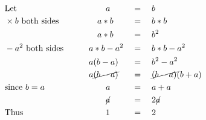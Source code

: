 \begin{alignat*}{3}
&\mathrm{Let}&&\qquad a&&=\quad b\\
&\times b~\mathrm{both~sides}&&\quad a*b&&=\quad b*b\\
&\,&&\quad a*b&&=\quad b^2\\
&-a^2~\mathrm{both~sides}\qquad&& a*b-a^2&&=\quad b*b-a^2\\
&\,&&a(b-a)&&=\quad b^2-a^2\\
&\,&&a\cancel{(b-a)}&&=\quad\cancel{(b-a)}(b+a)\\
&\mathrm{since}~b=a&&\qquad a&&=\quad a+a\\
&\,&&\qquad\cancel{a}&&=\quad2\cancel{a}\\
&\mathrm{Thus}&&\qquad1&&=\quad2
\end{alignat*}
